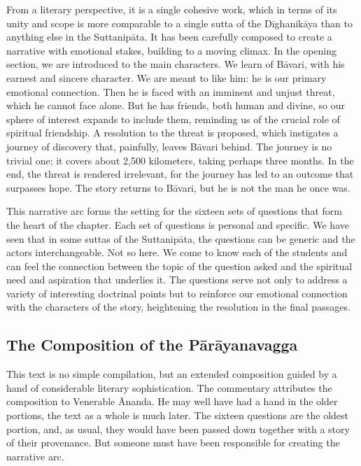 \documentclass[12pt,openany]{book}%
\begin{document}
From a literary perspective, it is a single cohesive work, which in terms of its unity and scope is more comparable to a single sutta of the \textsanskrit{Dīghanikāya} than to anything else in the \textsanskrit{Suttanipāta}. It has been carefully composed to create a narrative with emotional stakes, building to a moving climax. In the opening section, we are introduced to the main characters. We learn of \textsanskrit{Bāvari}, with his earnest and sincere character. We are meant to like him: he is our primary emotional connection. Then he is faced with an imminent and unjust threat, which he cannot face alone. But he has friends, both human and divine, so our sphere of interest expands to include them, reminding us of the crucial role of spiritual friendship. A resolution to the threat is proposed, which instigates a journey of discovery that, painfully, leaves \textsanskrit{Bāvari} behind. The journey is no trivial one; it covers about 2,500 kilometers, taking perhaps three months. In the end, the threat is rendered irrelevant, for the journey has led to an outcome that surpasses hope. The story returns to \textsanskrit{Bāvari}, but he is not the man he once was.

This narrative arc forms the setting for the sixteen sets of questions that form the heart of the chapter. Each set of questions is personal and specific. We have seen that in some suttas of the \textsanskrit{Suttanipāta}, the questions can be generic and the actors interchangeable. Not so here. We come to know each of the students and can feel the connection between the topic of the question asked and the spiritual need and aspiration that underlies it. The questions serve not only to address a variety of interesting doctrinal points but to reinforce our emotional connection with the characters of the story, heightening the resolution in the final passages.

\subsection*{The Composition of the \textsanskrit{Pārāyanavagga}}

This text is no simple compilation, but an extended composition guided by a hand of considerable literary sophistication. The commentary attributes the composition to Venerable Ānanda. He may well have had a hand in the older portions, the text as a whole is much later. The sixteen questions are the oldest portion, and, as usual, they would have been passed down together with a story of their provenance. But someone must have been responsible for creating the narrative arc.
\end{document}

